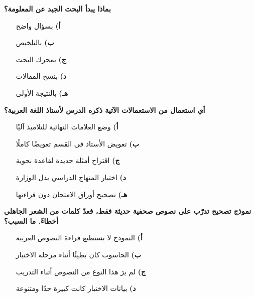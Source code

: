 \documentclass[11pt,a4paper]{article}
\begin{document}
\begin{multicols}{2}
\begin{minipage}{\linewidth}
\hangindent=0.7cm\textbf{بماذا يبدأ البحث الجيد عن المعلومة؟}
\begin{itemize}[leftmargin=0.95cm, labelsep=4pt, itemsep=0pt, topsep=2pt, parsep=0pt]
  \item[\textbf{أ)}] بسؤال واضح
  \item[\textbf{ب)}] بالتلخيص
  \item[\textbf{ج)}] بمحرك البحث
  \item[\textbf{د)}] بنسخ المقالات
  \item[\textbf{هـ)}] بالنتيجة الأولى
\end{itemize}
\end{minipage}\par\vspace{7pt plus 4pt}
\noindent\begin{minipage}{\linewidth}
\hangindent=0.7cm\textbf{أي استعمال من الاستعمالات الآتية ذكره الدرس لأستاذ اللغة العربية؟}
\begin{itemize}[leftmargin=0.95cm, labelsep=4pt, itemsep=0pt, topsep=2pt, parsep=0pt]
  \item[\textbf{أ)}] وضع العلامات النهائية للتلاميذ آليًا
  \item[\textbf{ب)}] تعويض الأستاذ في القسم تعويضًا كاملًا
  \item[\textbf{ج)}] اقتراح أمثلة جديدة لقاعدة نحوية
  \item[\textbf{د)}] اختيار المنهاج الدراسي بدل الوزارة
  \item[\textbf{هـ)}] تصحيح أوراق الامتحان دون قراءتها
\end{itemize}
\end{minipage}\par\vspace{7pt plus 4pt}
\noindent\begin{minipage}{\linewidth}
\hangindent=0.7cm\textbf{نموذج تصحيح تدرّب على نصوص صحفية حديثة فقط، فعدّ كلمات من الشعر الجاهلي أخطاءً. ما السبب؟}
\begin{itemize}[leftmargin=0.95cm, labelsep=4pt, itemsep=0pt, topsep=2pt, parsep=0pt]
  \item[\textbf{أ)}] النموذج لا يستطيع قراءة النصوص العربية
  \item[\textbf{ب)}] الحاسوب كان بطيئًا أثناء مرحلة الاختبار
  \item[\textbf{ج)}] لم يرَ هذا النوع من النصوص أثناء التدريب
  \item[\textbf{د)}] بيانات الاختبار كانت كبيرة جدًا ومتنوعة

\end{itemize}
\end{minipage}
\end{multicols}
\end{document}
